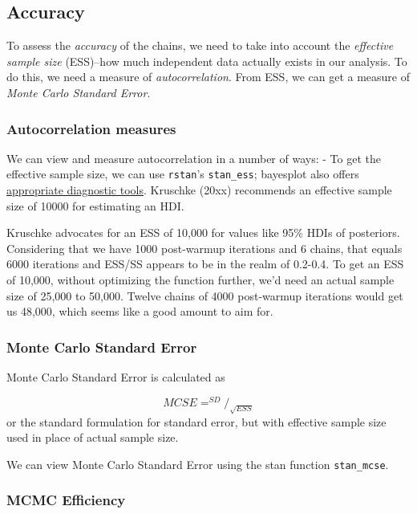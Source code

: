 \documentclass[]{article}
\begin{document}
\subsection{Accuracy}\label{accuracy}

To assess the \emph{accuracy} of the chains, we need to take into
account the \emph{effective sample size} (ESS)--how much independent
data actually exists in our analysis. To do this, we need a measure of
\emph{autocorrelation}. From ESS, we can get a measure of \emph{Monte
Carlo Standard Error}.

\subsubsection{Autocorrelation measures}\label{autocorrelation-measures}

We can view and measure autocorrelation in a number of ways: - To get
the effective sample size, we can use \texttt{rstan}'s
\texttt{stan\_ess}; bayesplot also offers
\href{\%5Bhttps://cran.r-project.org/web/packages/bayesplot/vignettes/visual-mcmc-diagnostics.html\#effective-sample-size}{appropriate
diagnostic tools}. Kruschke (20xx) recommends an effective sample size
of 10000 for estimating an HDI.

Kruschke advocates for an ESS of 10,000 for values like 95\% HDIs of
posteriors. Considering that we have 1000 post-warmup iterations and 6
chains, that equals 6000 iterations and ESS/SS appears to be in the
realm of 0.2-0.4. To get an ESS of 10,000, without optimizing the
function further, we'd need an actual sample size of 25,000 to 50,000.
Twelve chains of 4000 post-warmup iterations would get us 48,000, which
seems like a good amount to aim for.

\subsubsection{Monte Carlo Standard
Error}\label{monte-carlo-standard-error}

Monte Carlo Standard Error is calculated as

\[MCSE= ^{SD}/_{\sqrt{ESS}}\] or the standard formulation for standard
error, but with effective sample size used in place of actual sample
size.

We can view Monte Carlo Standard Error using the stan function
\texttt{stan\_mcse}.

\subsubsection{MCMC Efficiency}\label{mcmc-efficiency}
\end{document}
